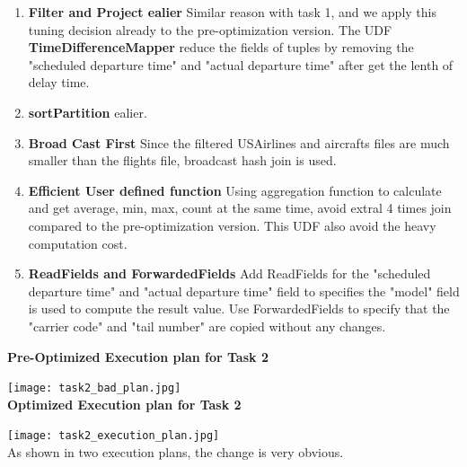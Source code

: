 \documentclass[12pt]{article}
\begin{document}
\begin{enumerate}

\item \textbf{Filter and Project ealier} Similar reason with task 1, and we apply this tuning decision already to the pre-optimization version. The UDF \textbf{TimeDifferenceMapper} reduce the fields of tuples by removing the "scheduled departure time" and "actual departure time" after get the lenth of delay time. 

\item \textbf{sortPartition} ealier. 

\item \textbf{Broad Cast First} Since the filtered USAirlines and aircrafts files are much smaller than the flights file, broadcast hash join is used. 

\item \textbf{Efficient User defined function} Using aggregation function to calculate and get average, min, max, count at the same time, avoid extral 4 times join compared to the pre-optimization version. This UDF also avoid the heavy computation cost. 

\item \textbf{ReadFields and ForwardedFields} Add ReadFields for the "scheduled departure time" and "actual departure time" field to specifies the "model" field is used to compute the result value. Use ForwardedFields to specify that the "carrier code" and "tail number" are copied without any changes. 

\end{enumerate}

\textbf{Pre-Optimized Execution plan for Task 2}

  \texttt{[image: task2\_bad\_plan.jpg]}\\[1.0 cm]

\textbf{Optimized Execution plan for Task 2}

  \texttt{[image: task2\_execution\_plan.jpg]}\\[1.0 cm] 

As shown in two execution plans, the change is very obvious. %





\end{document}
